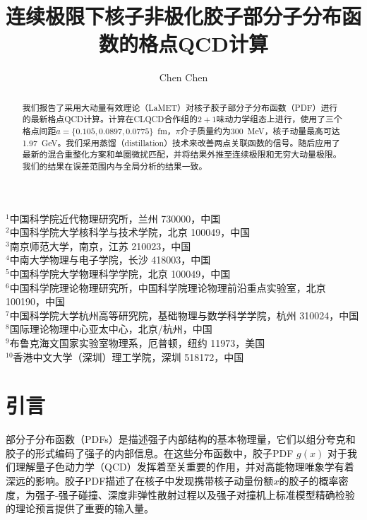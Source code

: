 \documentclass[12pt,a4paper]{ctexart}
\title{\heiti 连续极限下核子非极化胶子部分子分布函数的格点QCD计算}
\author{Chen Chen}
\date{}
\begin{document}
\maketitle

\begin{center}
\small
$^{1}$中国科学院近代物理研究所，兰州 730000，中国\\
$^{2}$中国科学院大学核科学与技术学院，北京 100049，中国\\
$^{3}$南京师范大学，南京，江苏 210023，中国\\
$^{4}$中南大学物理与电子学院，长沙 418003，中国\\
$^{5}$中国科学院大学物理科学学院，北京 100049，中国\\
$^{6}$中国科学院理论物理研究所，中国科学院理论物理前沿重点实验室，北京 100190，中国\\
$^{7}$中国科学院大学杭州高等研究院，基础物理与数学科学学院，杭州 310024，中国\\
$^{8}$国际理论物理中心亚太中心，北京/杭州，中国\\
$^{9}$布鲁克海文国家实验室物理系，厄普顿，纽约 11973，美国\\
$^{10}$香港中文大学（深圳）理工学院，深圳 518172，中国
\end{center}

\vspace{5pt}

\begin{abstract}
\noindent
我们报告了采用大动量有效理论（LaMET）对核子胶子部分子分布函数（PDF）进行的最新格点QCD计算。计算在CLQCD合作组的$2+1$味动力学组态上进行，使用了三个格点间距$a = \{0.105, 0.0897, 0.0775\}$~fm，$\pi$介子质量约为300~MeV，核子动量最高可达1.97~GeV。我们采用蒸馏（distillation）技术来改善两点关联函数的信号。随后应用了最新的混合重整化方案和单圈微扰匹配，并将结果外推至连续极限和无穷大动量极限。我们的结果在误差范围内与全局分析的结果一致。
\end{abstract}

\section{引言}

部分子分布函数（PDFs）是描述强子内部结构的基本物理量，它们以组分夸克和胶子的形式编码了强子的内部信息。在这些分布函数中，胶子PDF $g(x)$ 对于我们理解量子色动力学（QCD）发挥着至关重要的作用，并对高能物理唯象学有着深远的影响。胶子PDF描述了在核子中发现携带核子动量份额$x$的胶子的概率密度，为强子-强子碰撞、深度非弹性散射过程以及强子对撞机上标准模型精确检验的理论预言提供了重要的输入量。
\end{document}
